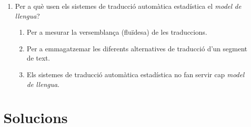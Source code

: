 \begin{enumerate}
\item Per a què usen els sistemes de traducció automàtica estadística
  el \emph{model de llengua}? 
  \begin{enumerate}
  \item Per a mesurar la versemblança (fluïdesa) de les traduccions.
  \item Per a emmagatzemar les diferents alternatives de traducció
    d'un segment de text.
  \item Els sistemes de traducció automàtica estadística no fan servir
    cap \emph{model de llengua}.
  \end{enumerate}
\end{enumerate}

\section{Solucions}

